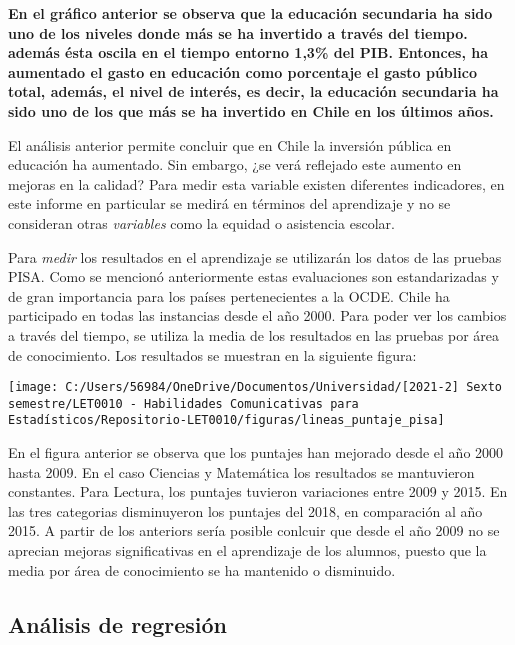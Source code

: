 \documentclass[
]{article}
\begin{document}
\textbf{En el gráfico anterior se observa que la educación secundaria ha
sido uno de los niveles donde más se ha invertido a través del tiempo.
además ésta oscila en el tiempo entorno 1,3\% del PIB. Entonces, ha
aumentado el gasto en educación como porcentaje el gasto público total,
además, el nivel de interés, es decir, la educación secundaria ha sido
uno de los que más se ha invertido en Chile en los últimos años.}

El análisis anterior permite concluir que en Chile la inversión pública
en educación ha aumentado. Sin embargo, ¿se verá reflejado este aumento
en mejoras en la calidad? Para medir esta variable existen diferentes
indicadores, en este informe en particular se medirá en términos del
aprendizaje y no se consideran otras \emph{variables} como la equidad o
asistencia escolar.

Para \emph{medir} los resultados en el aprendizaje se utilizarán los
datos de las pruebas PISA. Como se mencionó anteriormente estas
evaluaciones son estandarizadas y de gran importancia para los países
pertenecientes a la OCDE. Chile ha participado en todas las instancias
desde el año 2000. Para poder ver los cambios a través del tiempo, se
utiliza la media de los resultados en las pruebas por área de
conocimiento. Los resultados se muestran en la siguiente figura:

\begin{center}\texttt{[image: C:/Users/56984/OneDrive/Documentos/Universidad/[2021-2] Sexto semestre/LET0010 - Habilidades Comunicativas para Estadísticos/Repositorio-LET0010/figuras/lineas\_puntaje\_pisa]} \end{center}

En el figura anterior se observa que los puntajes han mejorado desde el
año 2000 hasta 2009. En el caso Ciencias y Matemática los resultados se
mantuvieron constantes. Para Lectura, los puntajes tuvieron variaciones
entre 2009 y 2015. En las tres categorias disminuyeron los puntajes del
2018, en comparación al año 2015. A partir de los anteriors sería
posible conlcuir que desde el año 2009 no se aprecian mejoras
significativas en el aprendizaje de los alumnos, puesto que la media por
área de conocimiento se ha mantenido o disminuido.

\hypertarget{anuxe1lisis-de-regresiuxf3n}{%
\subsection{Análisis de regresión}\label{anuxe1lisis-de-regresiuxf3n}}
\end{document}
